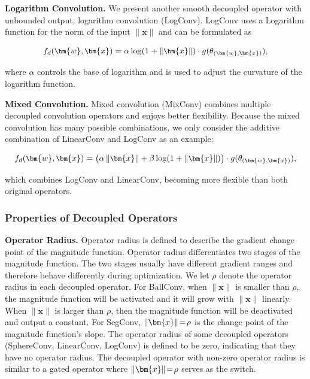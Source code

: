 \textbf{Logarithm Convolution.} We present another smooth decoupled operator with unbounded output, logarithm convolution (LogConv). LogConv uses a Logarithm function for the norm of the input $\|\bm{x}\|$ and can be formulated as

\begin{equation}
    \small
        f_d(\bm{w},\bm{x}) = \alpha\log(1+\left\lVert\bm{x}\right\rVert)\cdot g(\theta_{(\bm{w},\bm{x})}),
    \end{equation}

where $\alpha$ controls the base of logarithm and is used to adjust the curvature of the logarithm function.
\par

\textbf{Mixed Convolution.} Mixed convolution (MixConv) combines multiple decoupled convolution operators and enjoys better flexibility. Because the mixed convolution has many possible combinations, we only consider the additive combination of LinearConv and LogConv as an example:

\begin{equation}
    \small
        f_d(\bm{w},\bm{x}) = \big(\alpha\left\lVert\bm{x}\right\rVert+\beta\log(1+\left\lVert\bm{x}\right\rVert)\big)\cdot g(\theta_{(\bm{w},\bm{x})}),
    \end{equation}

which combines LogConv and LinearConv, becoming more flexible than both original operators.

\subsubsection{Properties of Decoupled Operators}

\textbf{Operator Radius.} Operator radius is defined to describe the gradient change point of the magnitude function. Operator radius differentiates two stages of the magnitude function. The two stages usually have different gradient ranges and therefore behave differently during optimization. We let $\rho$ denote the operator radius in each decoupled operator. For BallConv, when $\|\bm{x}\|$ is smaller than $\rho$, the magnitude function will be activated and it will grow with $\|\bm{x}\|$ linearly. When $\|\bm{x}\|$ is larger than $\rho$, then the magnitude function will be deactivated and output a constant. For SegConv, $\thickmuskip=2mu \medmuskip=2mu \|\bm{x}\|=\rho$ is the change point of the magnitude function's slope. The operator radius of some decoupled operators (SphereConv, LinearConv, LogConv) is defined to be zero, indicating that they have no operator radius. The decoupled operator with non-zero operator radius is similar to a gated operator where $\thickmuskip=2mu \medmuskip=2mu \|\bm{x}\|=\rho$ serves as the switch.

